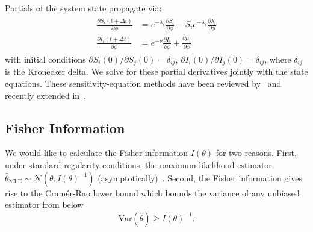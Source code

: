 \documentclass[11pt]{article}
\begin{document}
Partials of the system state propagate via:
\begin{align}\begin{split}\label{eq:sens}
\frac{\partial S_i(t+\Delta t)}{\partial \phi} &= e^{-\lambda_i}
\frac{\partial S_i}{\partial \phi} - S_i e^{-\lambda_i}
\frac{\partial \lambda_i}{\partial \phi} \\
\frac{\partial I_i(t+\Delta t)}{\partial \phi} &= e^{-\nu}
\frac{\partial I_i}{\partial \phi} +
\frac{\partial \mu_i}{\partial \phi}
\end{split}\end{align}
with initial conditions $\partial S_i(0)/\partial S_j(0) =
\delta_{ij}$, $\partial I_i(0)/\partial I_j(0) = \delta_{ij}$, where
$\delta_{ij}$ is the Kronecker delta. We solve for these partial
derivatives jointly with the state equations. These
sensitivity-equation methods have been reviewed
by~\citep{wu2013sensitivity} and recently extended
in~\citep{mester2022}.

\subsection{Fisher Information}\label{subsec:crlb}
We would like to calculate the Fisher information $I(\theta)$ for two
reasons. First, under standard regularity conditions, the
maximum-likelihood estimator $\hat\theta_{\text{MLE}} \sim
\mathcal{N}(\theta, I(\theta)^{-1})$
(asymptotically)~\citep{wilke2020}. Second, the Fisher information
gives rise to the Cram\'er-Rao lower bound which bounds the variance
of any unbiased estimator from below
\begin{equation}\label{eq:crlb}
  \text{Var}(\hat{\theta}) \geq I(\theta)^{-1}.%
\end{equation}
\end{document}
